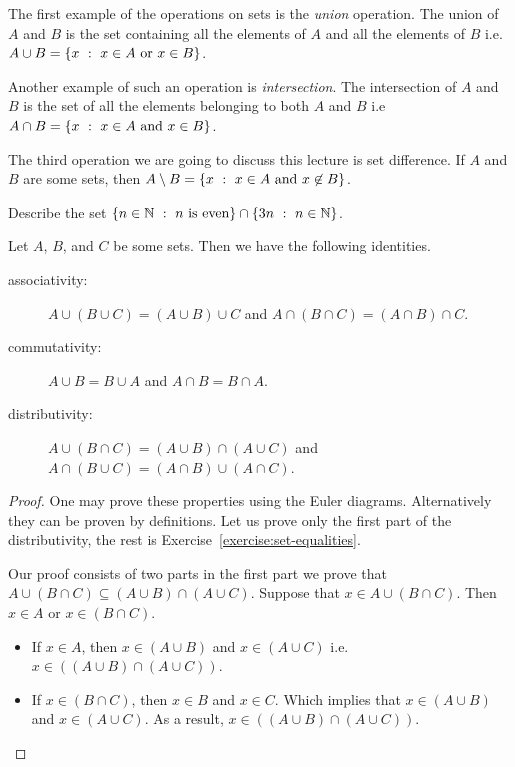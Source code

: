 The first example of the operations on sets is the \textit{union} operation.
The union of $A$ and $B$ is the set containing all the elements of $A$ and all
the elements of $B$ i.e. $A \cup B = \set[x \in A \text{ or } x \in B]{x}$.

Another example of such an operation is \textit{intersection}. The
intersection of $A$ and $B$ is the set of all the elements belonging to both
$A$ and $B$ i.e $A \cap B = \set[x \in A \text{ and } x \in B]{x}$.

The third operation we are going to discuss this lecture is set difference.
If $A$ and $B$ are some sets, then
$A \setminus B = \set[x \in A \text{ and } x \not\in B]{x}$.

\begin{exercise}
  Describe the set
  $\set[n \text{ is even}]{n \in \N} \cap \set[n \in \N]{3n}$.
\end{exercise}

\begin{theorem}
\label{theorem:set-equalities}
  Let $A$, $B$, and $C$ be some sets. Then we have the following identities.
  \begin{description}
    \item[associativity:] $A \cup (B \cup C) = (A \cup B) \cup C$ and
      $A \cap (B \cap C) = (A \cap B) \cap C$.
    \item[commutativity:] $A \cup B = B \cup A$ and $A \cap B = B \cap A$.
    \item[distributivity:] $A \cup (B \cap C) = (A \cup B) \cap (A \cup C)$
      and $A \cap (B \cup C) = (A \cap B) \cup (A \cap C)$.
  \end{description}
\end{theorem}
\begin{proof}
  One may prove these properties using the Euler diagrams. Alternatively they
  can be proven by definitions. Let us prove only the first part of the
  distributivity, the rest is Exercise~\ref{exercise:set-equalities}.

  Our proof consists of two parts in the first part we prove that
  $A \cup (B \cap C) \subseteq (A \cup B) \cap (A \cup C)$.
  Suppose that $x \in A \cup (B \cap C)$. Then $x \in A$ or $x \in (B \cap C)$.
  \begin{itemize}
    \item If $x \in A$, then $x \in (A \cup B)$ and $x \in (A \cup C)$ i.e.
      $x \in ((A \cup B) \cap (A \cup C))$.
    \item If $x \in (B \cap C)$, then $x \in B$ and $x \in C$. Which implies
      that $x \in (A \cup B)$ and $x \in (A \cup C)$. As a result,
      $x \in ((A \cup B) \cap (A \cup C))$.
  \end{itemize}
\end{proof}

